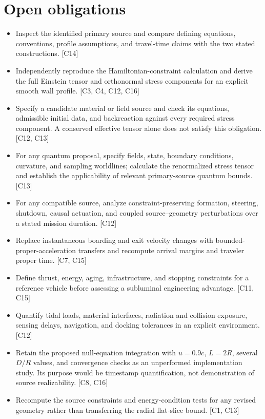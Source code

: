 \documentclass[11pt]{article}
\begin{document}
\section{Open obligations}
\begin{itemize}
\item Inspect the identified primary source and compare defining equations, conventions, profile assumptions, and travel-time claims with the two stated constructions. [C14]
\item Independently reproduce the Hamiltonian-constraint calculation and derive the full Einstein tensor and orthonormal stress components for an explicit smooth wall profile. [C3, C4, C12, C16]
\item Specify a candidate material or field source and check its equations, admissible initial data, and backreaction against every required stress component. A conserved effective tensor alone does not satisfy this obligation. [C12, C13]
\item For any quantum proposal, specify fields, state, boundary conditions, curvature, and sampling worldlines; calculate the renormalized stress tensor and establish the applicability of relevant primary-source quantum bounds. [C13]
\item For any compatible source, analyze constraint-preserving formation, steering, shutdown, causal actuation, and coupled source–geometry perturbations over a stated mission duration. [C12]
\item Replace instantaneous boarding and exit velocity changes with bounded-proper-acceleration transfers and recompute arrival margins and traveler proper time. [C7, C15]
\item Define thrust, energy, aging, infrastructure, and stopping constraints for a reference vehicle before assessing a subluminal engineering advantage. [C11, C15]
\item Quantify tidal loads, material interfaces, radiation and collision exposure, sensing delays, navigation, and docking tolerances in an explicit environment. [C12]
\item Retain the proposed null-equation integration with $u=0.9c$, $L=2R$, several $D/R$ values, and convergence checks as an unperformed implementation study. Its purpose would be timestamp quantification, not demonstration of source realizability. [C8, C16]
\item Recompute the source constraints and energy-condition tests for any revised geometry rather than transferring the radial flat-slice bound. [C1, C13]
\end{itemize}
\end{document}
